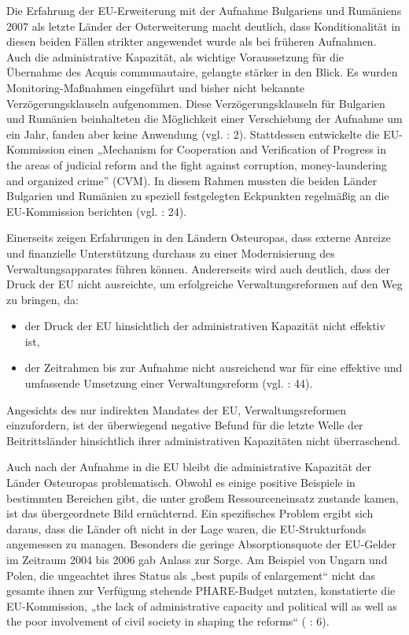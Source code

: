 Die Erfahrung der EU-Erweiterung mit der Aufnahme Bulgariens und Rumäniens 2007 als letzte Länder der Osterweiterung macht deutlich, dass Konditionalität in diesen beiden Fällen strikter angewendet wurde als bei früheren Aufnahmen. Auch die administrative Kapazität, als wichtige Voraussetzung für die Übernahme des Acquis communautaire, gelangte stärker in den Blick. Es wurden Monitoring-Maßnahmen eingeführt und bisher nicht bekannte Verzögerungsklauseln aufgenommen. Diese Verzögerungsklauseln für Bulgarien und Rumänien beinhalteten die Möglichkeit einer Verschiebung der Aufnahme um ein Jahr, fanden aber keine Anwendung (vgl. \cite{phinnemore} : 2). Stattdessen entwickelte die EU-Kommission einen „Mechanism for Cooperation and Verification of Progress in the areas of judicial reform and the fight against corruption, money-laundering and organized crime” (CVM). In diesem Rahmen mussten die beiden Länder Bulgarien und Rumänien zu speziell festgelegten Eckpunkten regelmäßig an die EU-Kommission berichten (vgl. \cite{summa} : 24). 
\par
Einerseits zeigen Erfahrungen in den Ländern Osteuropas, dass externe Anreize und finanzielle Unterstützung durchaus zu einer Modernisierung des Verwaltungsapparates führen können. Andererseits wird auch deutlich, dass der Druck der EU nicht ausreichte, um erfolgreiche Verwaltungsreformen auf den Weg zu bringen, da:
\begin{itemize} \itemsep1pt \parskip0pt 
\item der Druck der EU hinsichtlich der administrativen Kapazität nicht effektiv ist, 
\item der Zeitrahmen bis zur Aufnahme nicht ausreichend war für eine effektive und umfassende Umsetzung einer Verwaltungsreform (vgl. \cite{verheijen06} : 44).
\end{itemize}
Angesichts des nur indirekten Mandates der EU, Verwaltungsreformen einzufordern, ist der überwiegend negative Befund für die letzte Welle der Beitrittsländer hinsichtlich ihrer administrativen Kapazitäten nicht überraschend.\par
Auch nach der Aufnahme in die EU bleibt die administrative Kapazität der Länder Osteuropas problematisch. Obwohl es einige positive Beispiele in bestimmten Bereichen gibt, die unter großem Ressourceneinsatz zustande kamen, ist das übergeordnete Bild ernüchternd. Ein spezifisches Problem ergibt sich daraus, dass die Länder oft nicht in der Lage waren, die EU-Strukturfonds angemessen zu managen. Besonders die geringe Absorptionsquote der EU-Gelder im Zeitraum 2004 bis 2006 gab Anlass zur Sorge. Am Beispiel von Ungarn und Polen, die ungeachtet ihres Status als „best pupils of enlargement“ nicht das gesamte ihnen zur Verfügung stehende PHARE-Budget nutzten, konstatierte die EU-Kommission, „the lack of administrative capacity and political will as well as the poor involvement of civil society in shaping the reforms“ (\cite{tulmets06} : 6).\par
